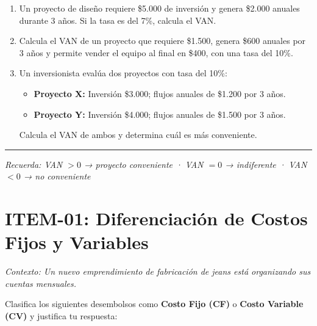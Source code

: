 \documentclass[12pt,a4paper]{article}
\newcommand{\answerspace}{\vspace{4.5cm}}
\newcommand{\lastanswerspace}{\vspace{2cm}}
\begin{document}
\begin{enumerate}[label=\textbf{\arabic*.}, leftmargin=*, itemsep=0pt]
\item Un proyecto de diseño requiere \$5.000 de inversión y genera \$2.000 anuales durante 3 años. Si la tasa es del 7\%, calcula el VAN.
\answerspace

\item Calcula el VAN de un proyecto que requiere \$1.500, genera \$600 anuales por 3 años y permite vender el equipo al final en \$400, con una tasa del 10\%.
\answerspace

\item Un inversionista evalúa dos proyectos con tasa del 10\%:
  \begin{itemize}
    \item \textbf{Proyecto X:} Inversión \$3.000; flujos anuales de \$1.200 por 3 años.
    \item \textbf{Proyecto Y:} Inversión \$4.000; flujos anuales de \$1.500 por 3 años.
  \end{itemize}
  Calcula el VAN de ambos y determina cuál es más conveniente.
\lastanswerspace

\end{enumerate}

\vspace{1em}
\noindent\rule{\textwidth}{0.8pt}
\begin{center}
  \small\textit{Recuerda: VAN $> 0$ → proyecto conveniente \quad · \quad VAN $= 0$ → indiferente \quad · \quad VAN $< 0$ → no conveniente}
\end{center}

\newpage

\section{ITEM-01: Diferenciación de Costos Fijos y Variables}

\noindent\textit{Contexto: Un nuevo emprendimiento de fabricación de jeans está organizando sus cuentas mensuales.}

\vspace{0.5em}
\noindent Clasifica los siguientes desembolsos como \textbf{Costo Fijo (CF)} o \textbf{Costo Variable (CV)} y justifica tu respuesta:
\end{document}
